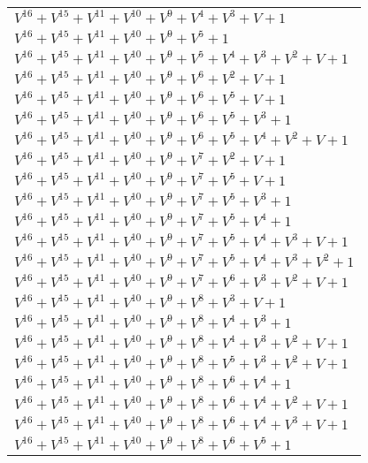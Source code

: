 \documentclass[12pt]{article}
\begin{document}
\begin{adjustwidth}{-4cm}{}
\begin{center}
\begin{longtable}{|l|}
$V^{16}  +V^{15}  +V^{11}  +V^{10}  +V^{9}  +V^{4}  +V^{3}  + V + 1$ \\
$V^{16}  +V^{15}  +V^{11}  +V^{10}  +V^{9}  +V^{5}  + 1$ \\
$V^{16}  +V^{15}  +V^{11}  +V^{10}  +V^{9}  +V^{5}  +V^{4}  +V^{3}  +V^{2}  + V + 1$ \\
$V^{16}  +V^{15}  +V^{11}  +V^{10}  +V^{9}  +V^{6}  +V^{2}  + V + 1$ \\
$V^{16}  +V^{15}  +V^{11}  +V^{10}  +V^{9}  +V^{6}  +V^{5}  + V + 1$ \\
$V^{16}  +V^{15}  +V^{11}  +V^{10}  +V^{9}  +V^{6}  +V^{5}  +V^{3}  + 1$ \\
$V^{16}  +V^{15}  +V^{11}  +V^{10}  +V^{9}  +V^{6}  +V^{5}  +V^{4}  +V^{2}  + V + 1$ \\
$V^{16}  +V^{15}  +V^{11}  +V^{10}  +V^{9}  +V^{7}  +V^{2}  + V + 1$ \\
$V^{16}  +V^{15}  +V^{11}  +V^{10}  +V^{9}  +V^{7}  +V^{5}  + V + 1$ \\
$V^{16}  +V^{15}  +V^{11}  +V^{10}  +V^{9}  +V^{7}  +V^{5}  +V^{3}  + 1$ \\
$V^{16}  +V^{15}  +V^{11}  +V^{10}  +V^{9}  +V^{7}  +V^{5}  +V^{4}  + 1$ \\
$V^{16}  +V^{15}  +V^{11}  +V^{10}  +V^{9}  +V^{7}  +V^{5}  +V^{4}  +V^{3}  + V + 1$ \\
$V^{16}  +V^{15}  +V^{11}  +V^{10}  +V^{9}  +V^{7}  +V^{5}  +V^{4}  +V^{3}  +V^{2}  + 1$ \\
$V^{16}  +V^{15}  +V^{11}  +V^{10}  +V^{9}  +V^{7}  +V^{6}  +V^{3}  +V^{2}  + V + 1$ \\
$V^{16}  +V^{15}  +V^{11}  +V^{10}  +V^{9}  +V^{8}  +V^{3}  + V + 1$ \\
$V^{16}  +V^{15}  +V^{11}  +V^{10}  +V^{9}  +V^{8}  +V^{4}  +V^{3}  + 1$ \\
$V^{16}  +V^{15}  +V^{11}  +V^{10}  +V^{9}  +V^{8}  +V^{4}  +V^{3}  +V^{2}  + V + 1$ \\
$V^{16}  +V^{15}  +V^{11}  +V^{10}  +V^{9}  +V^{8}  +V^{5}  +V^{3}  +V^{2}  + V + 1$ \\
$V^{16}  +V^{15}  +V^{11}  +V^{10}  +V^{9}  +V^{8}  +V^{6}  +V^{4}  + 1$ \\
$V^{16}  +V^{15}  +V^{11}  +V^{10}  +V^{9}  +V^{8}  +V^{6}  +V^{4}  +V^{2}  + V + 1$ \\
$V^{16}  +V^{15}  +V^{11}  +V^{10}  +V^{9}  +V^{8}  +V^{6}  +V^{4}  +V^{3}  + V + 1$ \\
$V^{16}  +V^{15}  +V^{11}  +V^{10}  +V^{9}  +V^{8}  +V^{6}  +V^{5}  + 1$ \\

\end{longtable}
\end{center}
\end{adjustwidth}
\end{document}
